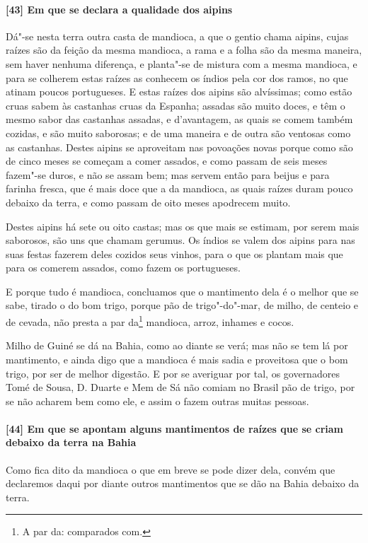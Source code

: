 \paragraph{[43] Em que se declara a qualidade dos aipins}\quad
Dá"-se nesta terra outra casta de mandioca, a que o gentio chama aipins, cujas raízes são
da feição da mesma mandioca, a rama e a folha são da mesma maneira, sem haver nenhuma
diferença, e planta"-se de mistura com a mesma mandioca, e para se colherem estas raízes as
conhecem os índios pela cor dos ramos, no que atinam poucos portugueses. E estas raízes
dos aipins são alvíssimas; como estão cruas sabem às castanhas cruas da Espanha; assadas
são muito doces, e têm o mesmo sabor das castanhas assadas, e d'avantagem, as quais se
comem também cozidas, e são muito saborosas; e de uma maneira e de outra são ventosas como
as castanhas. Destes aipins se aproveitam nas povoações novas porque como são de cinco
meses se começam a comer assados, e como passam de seis meses fazem"-se duros, e não se
assam bem; mas servem então para beijus e para farinha fresca, que é mais doce que a da
mandioca, as quais raízes duram pouco debaixo da terra, e como passam de oito meses
apodrecem muito.

Destes aipins há sete ou oito castas; mas os que mais se estimam, por serem mais
saborosos, são uns que chamam gerumus. Os índios se valem dos aipins para nas suas festas
fazerem deles cozidos seus vinhos, para o que os plantam mais que para os comerem assados,
como fazem os portugueses.

E porque tudo é mandioca, concluamos que o mantimento dela é o melhor que se sabe, tirado
o do bom trigo, porque pão de trigo"-do"-mar, de milho, de centeio e de cevada, não presta a
par da\footnote{ A par da: comparados com.} mandioca, arroz, inhames e cocos.

Milho de Guiné se dá na Bahia, como ao diante se verá; mas não se tem lá por mantimento, e
ainda digo que a mandioca é mais sadia e proveitosa que o bom trigo, por ser de melhor
digestão. E por se averiguar por tal, os governadores Tomé de Sousa, D. Duarte e Mem de Sá
não comiam no Brasil pão de trigo, por se não acharem bem como ele, e assim o fazem outras
muitas pessoas.

\paragraph{[44] Em que se apontam alguns mantimentos de raízes que se criam debaixo da terra
na Bahia}\quad
Como fica dito da mandioca o que em breve se pode dizer dela, convém que declaremos daqui
por diante outros mantimentos que se dão na Bahia debaixo da terra.

